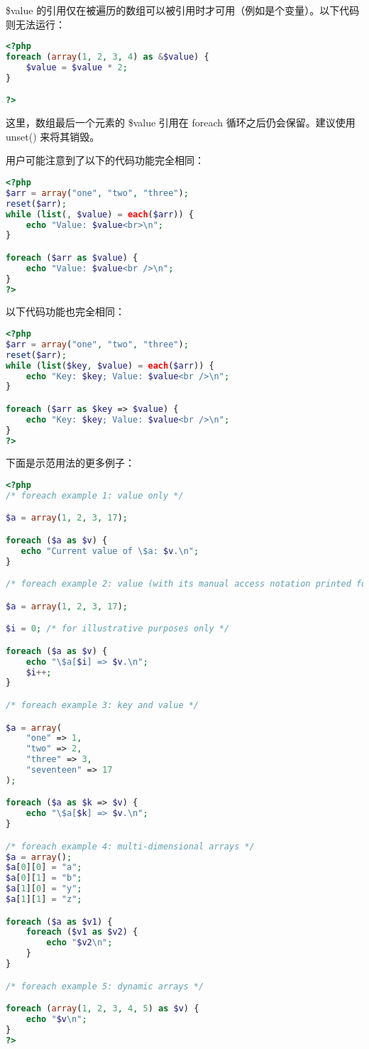\$value 的引用仅在被遍历的数组可以被引用时才可用（例如是个变量）。以下代码则无法运行：


\begin{lstlisting}[language=PHP]
<?php
foreach (array(1, 2, 3, 4) as &$value) {
    $value = $value * 2;
}

?>
\end{lstlisting}

这里，数组最后一个元素的 \$value 引用在 foreach 循环之后仍会保留。建议使用 unset() 来将其销毁。

用户可能注意到了以下的代码功能完全相同：

\begin{lstlisting}[language=PHP]
<?php
$arr = array("one", "two", "three");
reset($arr);
while (list(, $value) = each($arr)) {
    echo "Value: $value<br>\n";
}

foreach ($arr as $value) {
    echo "Value: $value<br />\n";
}
?>
\end{lstlisting}

以下代码功能也完全相同：

\begin{lstlisting}[language=PHP]
<?php
$arr = array("one", "two", "three");
reset($arr);
while (list($key, $value) = each($arr)) {
    echo "Key: $key; Value: $value<br />\n";
}

foreach ($arr as $key => $value) {
    echo "Key: $key; Value: $value<br />\n";
}
?>
\end{lstlisting}


下面是示范用法的更多例子：

\begin{lstlisting}[language=PHP]
<?php
/* foreach example 1: value only */

$a = array(1, 2, 3, 17);

foreach ($a as $v) {
   echo "Current value of \$a: $v.\n";
}

/* foreach example 2: value (with its manual access notation printed for illustration) */

$a = array(1, 2, 3, 17);

$i = 0; /* for illustrative purposes only */

foreach ($a as $v) {
    echo "\$a[$i] => $v.\n";
    $i++;
}

/* foreach example 3: key and value */

$a = array(
    "one" => 1,
    "two" => 2,
    "three" => 3,
    "seventeen" => 17
);

foreach ($a as $k => $v) {
    echo "\$a[$k] => $v.\n";
}

/* foreach example 4: multi-dimensional arrays */
$a = array();
$a[0][0] = "a";
$a[0][1] = "b";
$a[1][0] = "y";
$a[1][1] = "z";

foreach ($a as $v1) {
    foreach ($v1 as $v2) {
        echo "$v2\n";
    }
}

/* foreach example 5: dynamic arrays */

foreach (array(1, 2, 3, 4, 5) as $v) {
    echo "$v\n";
}
?>
\end{lstlisting}



